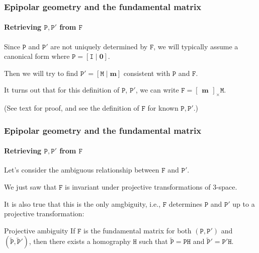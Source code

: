 \documentclass[aspectratio=169]{beamer}
\renewcommand{\vec}[1]{\boldsymbol{#1}}
\newcommand{\mat}[1]{\mathtt{#1}}
\newcommand{\crossmat}[1]{\begin{bmatrix} #1 \end{bmatrix}_{\times}}
\begin{document}
\begin{frame}
\frametitle{Epipolar geometry and the fundamental matrix}
\framesubtitle{Retrieving $\mat{P},\mat{P}'$ from $\mat{F}$}

Since $\mat{P}$ and $\mat{P}'$ are not uniquely determined by
$\mat{F}$, we will typically assume a \alert{canonical form} where
$\mat{P} = [\mat{I} \mid \vec{0}]$.

\medskip

Then we will try to find
$\mat{P}'=[\mat{M}\mid{\vec{m}}]$ consistent with $\mat{P}$ and
$\mat{F}$.

\medskip

It turns out that for this definition of $\mat{P}$, $\mat{P}'$,
we can write $\mat{F}=\crossmat{\vec{m}}\mat{M}$.

\medskip

(See text for proof, and see the definition of
 $\mat{F}$ for known $\mat{P},\mat{P}'$.)

\end{frame}

\begin{frame}
\frametitle{Epipolar geometry and the fundamental matrix}
\framesubtitle{Retrieving $\mat{P},\mat{P}'$ from $\mat{F}$}

Let's consider the ambiguous relationship between $\mat{F}$ and
$\mat{P}'$.

\medskip

We just saw that $\mat{F}$ is invariant under projective
transformations of 3-space.

\medskip

It is also true that this is the only amgbiguity, i.e., $\mat{F}$
determines $\mat{P}$ and $\mat{P}'$ up to a projective transformation:

\begin{block}{Projective ambiguity}
If $\mat{F}$ is the fundamental matrix
for both $(\mat{P},\mat{P}')$ and
$(\tilde{\mat{P}},\tilde{\mat{P}}')$, then there exists a homography
$\mat{H}$ such that $\tilde{\mat{P}}=\mat{P}\mat{H}$ and
$\tilde{\mat{P}}'=\mat{P}'\mat{H}$.
\end{block}

\end{frame}
\end{document}
